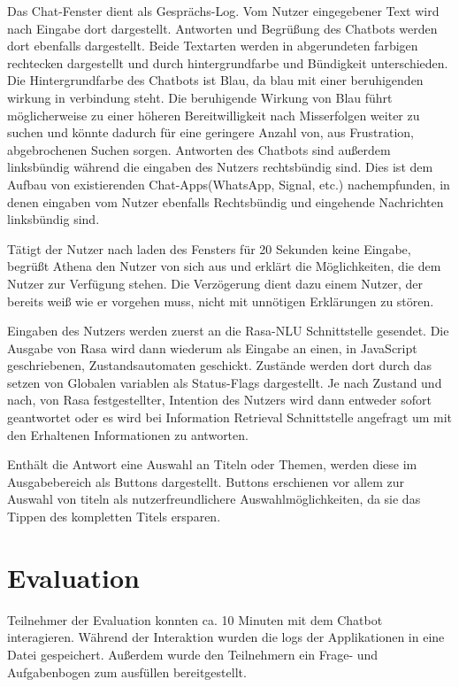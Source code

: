 \documentclass[12pt,a4paper]{article}
\begin{document}
Das Chat-Fenster dient als Gesprächs-Log.
Vom Nutzer eingegebener Text wird nach Eingabe dort dargestellt.
Antworten und Begrüßung des Chatbots werden dort ebenfalls dargestellt.
Beide Textarten werden in abgerundeten farbigen rechtecken dargestellt und durch hintergrundfarbe und Bündigkeit unterschieden.
Die Hintergrundfarbe des Chatbots ist Blau, da blau mit einer beruhigenden wirkung in verbindung steht. \cite{Singh2006}
Die beruhigende Wirkung von Blau führt möglicherweise zu einer höheren Bereitwilligkeit nach Misserfolgen weiter zu suchen und könnte dadurch für eine geringere Anzahl von, aus Frustration, abgebrochenen Suchen sorgen.
Antworten des Chatbots sind außerdem linksbündig während die eingaben des Nutzers rechtsbündig sind.
Dies ist dem Aufbau von existierenden Chat-Apps(WhatsApp, Signal, etc.) nachempfunden, in denen eingaben vom Nutzer ebenfalls Rechtsbündig und eingehende Nachrichten linksbündig sind.

Tätigt der Nutzer nach laden des Fensters für 20 Sekunden keine Eingabe, begrüßt Athena den Nutzer von sich aus und erklärt die Möglichkeiten, die dem Nutzer zur Verfügung stehen.
Die Verzögerung dient dazu einem Nutzer, der bereits weiß wie er vorgehen muss, nicht mit unnötigen Erklärungen zu stören.

Eingaben des Nutzers werden zuerst an die Rasa-NLU Schnittstelle gesendet.
Die Ausgabe von Rasa wird dann wiederum als Eingabe an einen, in JavaScript geschriebenen, Zustandsautomaten geschickt.
Zustände werden dort durch das setzen von Globalen variablen als Status-Flags dargestellt.
Je nach Zustand und nach, von Rasa festgestellter, Intention des Nutzers wird dann entweder sofort geantwortet oder es wird bei Information Retrieval Schnittstelle angefragt um mit den Erhaltenen Informationen zu antworten.

Enthält die Antwort eine Auswahl an Titeln oder Themen, werden diese im Ausgabebereich als Buttons dargestellt.
Buttons erschienen vor allem zur Auswahl von titeln als nutzerfreundlichere Auswahlmöglichkeiten, da sie das Tippen des kompletten Titels ersparen.

\section{Evaluation}

Teilnehmer der Evaluation konnten ca. 10 Minuten mit dem Chatbot interagieren.
Während der Interaktion wurden die logs der Applikationen in eine Datei gespeichert.
Außerdem wurde den Teilnehmern ein Frage- und Aufgabenbogen zum ausfüllen bereitgestellt.
\end{document}
